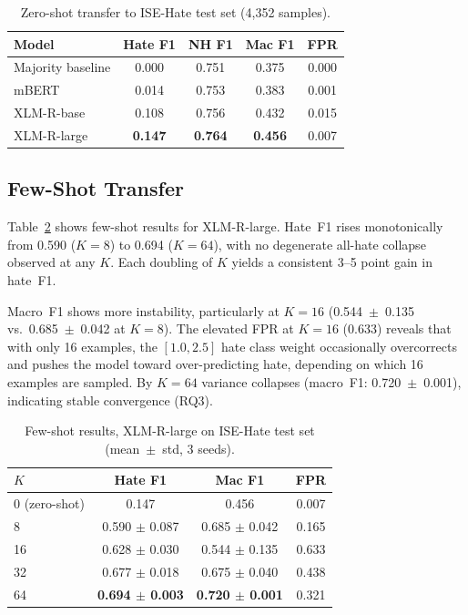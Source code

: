 \documentclass{article}
\begin{document}
\begin{table}[h]
\centering
\caption{Zero-shot transfer to ISE-Hate test set (4{,}352 samples).}
\label{tab:zs_results}
\vskip 0.05in
\begin{small}
\begin{tabular}{lcccc}
\toprule
Model & Hate F1 & NH F1 & Mac F1 & FPR \\
\midrule
Majority baseline   & 0.000 & 0.751 & 0.375 & 0.000 \\
mBERT               & 0.014 & 0.753 & 0.383 & 0.001 \\
XLM-R-base          & 0.108 & 0.756 & 0.432 & 0.015 \\
XLM-R-large         & \textbf{0.147} & \textbf{0.764} & \textbf{0.456} & 0.007 \\
\bottomrule
\end{tabular}
\end{small}
\end{table}

\subsection{Few-Shot Transfer}

Table~\ref{tab:fs_results} shows few-shot results for XLM-R-large.
Hate~F1 rises monotonically from 0.590 ($K=8$) to 0.694 ($K=64$),
with no degenerate all-hate collapse observed at any $K$.
Each doubling of $K$ yields a consistent 3--5 point gain in hate~F1.

Macro~F1 shows more instability, particularly at $K=16$
(0.544~$\pm$~0.135 vs.\ 0.685~$\pm$~0.042 at $K=8$).
The elevated FPR at $K=16$ (0.633) reveals that with only 16 examples,
the $[1.0, 2.5]$ hate class weight occasionally overcorrects and pushes
the model toward over-predicting hate, depending on which 16 examples are
sampled.
By $K=64$ variance collapses (macro~F1: 0.720~$\pm$~0.001), indicating
stable convergence (RQ3).

\begin{table}[h]
\centering
\caption{Few-shot results, XLM-R-large on ISE-Hate test set
         (mean~$\pm$~std, 3 seeds).}
\label{tab:fs_results}
\vskip 0.05in
\begin{small}
\begin{tabular}{lccc}
\toprule
$K$ & Hate F1 & Mac F1 & FPR \\
\midrule
0 (zero-shot) & 0.147 & 0.456 & 0.007 \\
8  & 0.590 $\pm$ 0.087 & 0.685 $\pm$ 0.042 & 0.165 \\
16 & 0.628 $\pm$ 0.030 & 0.544 $\pm$ 0.135 & 0.633 \\
32 & 0.677 $\pm$ 0.018 & 0.675 $\pm$ 0.040 & 0.438 \\
64 & \textbf{0.694 $\pm$ 0.003} & \textbf{0.720 $\pm$ 0.001} & 0.321 \\
\bottomrule
\end{tabular}
\end{small}
\end{table}
\end{document}
